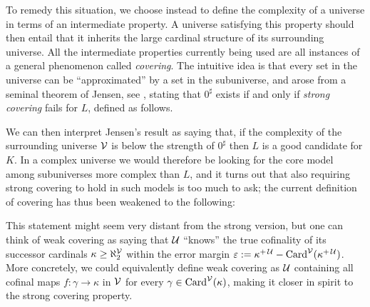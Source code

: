 \documentclass[../../main]{subfiles}
\begin{document}
\qquad To remedy this situation, we choose instead to define the complexity of a universe in terms of an intermediate property. A universe satisfying this property should then entail that it inherits the large cardinal structure of its surrounding universe. All the intermediate properties currently being used are all instances of a general phenomenon called \textit{covering}. The intuitive idea is that every set in the universe can be ``approximated'' by a set in the subuniverse, and arose from a seminal theorem of Jensen, see \cite[11.56]{SchindlerBook}, stating that $0^\sharp$ exists if and only if \textit{strong covering} fails for $L$, defined as follows.


We can then interpret Jensen's result as saying that, if the complexity of the surrounding universe $\operatorname{\mathcal V}$ is below the strength of $0^\sharp$ then $L$ is a good candidate for $K$. In a complex universe we would therefore be looking for the core model among subuniverses more complex than $L$, and it turns out that also requiring strong covering to hold in such models is too much to ask; the current definition of covering has thus been weakened to the following:


This statement might seem very distant from the strong version, but one can think of weak covering as saying that $\operatorname{\mathcal U}$ ``knows'' the true cofinality of its successor cardinals $\kappa\geq\aleph_2^{\operatorname{\mathcal V}}$ within the error margin $\varepsilon:=\kappa^{+\operatorname{\mathcal U}}-\operatorname{Card}^{\operatorname{\mathcal V}}(\kappa^{+\operatorname{\mathcal U}})$. More concretely, we could equivalently define weak covering as $\operatorname{\mathcal U}$ containing all cofinal maps $f\colon\gamma\to\kappa$ in $\operatorname{\mathcal V}$ for every $\gamma\in\operatorname{Card}^{\operatorname{\mathcal V}}(\kappa)$, making it closer in spirit to the strong covering property.
\end{document}
